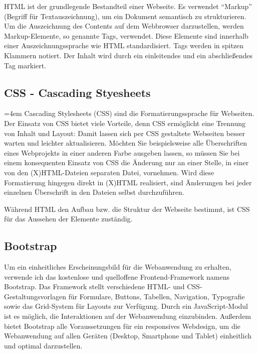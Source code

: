 HTML ist der grundlegende Bestandteil einer Webseite. Es verwendet “Markup” (Begriff für Textauszeichnung), um ein Dokument semantisch zu strukturieren. Um die Auszeichnung des Contents auf dem Webbrowser darzustellen, werden Markup-Elemente, so genannte Tags, verwendet. Diese Elemente sind innerhalb einer Auszeichnungssprache wie HTML standardisiert. Tags werden in spitzen Klammern notiert. Der Inhalt wird durch ein einleitendes und ein abschließendes Tag markiert.

\subsection{CSS - Cascading Styesheets}
\label{subsec:css}
\par
\begingroup
\leftskip=4em %
\rightskip\leftskip
\noindent \glqq Cascading Stylesheets (CSS) sind die Formatierungssprache für Webseiten. Der Einsatz von CSS bietet viele Vorteile, denn CSS ermöglicht eine Trennung von Inhalt und Layout: Damit lassen sich per CSS gestaltete Webseiten besser warten und leichter aktualisieren. Möchten Sie beispielsweise alle Überschriften eines Webprojekts in einer anderen Farbe ausgeben lassen, so müssen Sie bei einem konsequenten Einsatz von CSS die Änderung nur an einer Stelle, in einer von den (X)HTML-Dateien separaten Datei, vornehmen. Wird diese Formatierung hingegen direkt in (X)HTML realisiert, sind Änderungen bei jeder einzelnen Überschrift in den Dateien selbst durchzuführen.\grqq{} \cite{WHM2011}
\par
\endgroup
\bigskip

Während HTML den Aufbau bzw. die Struktur der Webseite bestimmt, ist CSS für das Aussehen der Elemente zuständig.

\subsection{Bootstrap}
\label{subsec:bootstrap}
Um ein einheitliches Erscheinungsbild für die Webanwendung zu erhalten, verwende ich das kostenlose und quelloffene Frontend-Framework namens Bootstrap.
Das Framework stellt verschiedene HTML- und CSS-Gestaltungsvorlagen für Formulare, Buttons, Tabellen, Navigation, Typografie sowie das Grid-System für Layouts zur Verfügung. Durch ein JavaScript-Modul ist es möglich, die Interaktionen auf der Webanwendung einzubinden. Außerdem bietet Bootstrap alle Voraussetzungen für ein responsives Webdesign, um die Webanwendung auf allen Geräten (Desktop, Smartphone und Tablet) einheitlich und optimal darzustellen.

